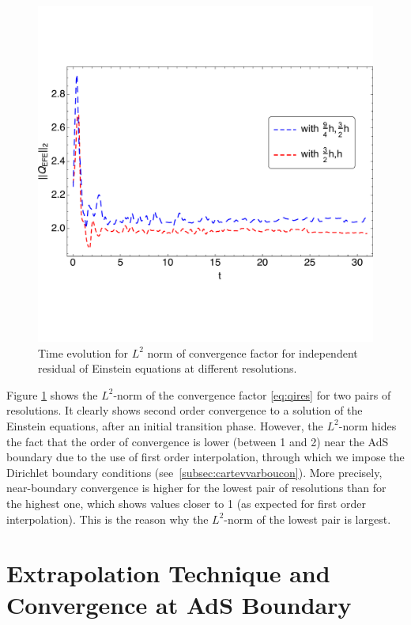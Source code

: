 \documentclass[a4paper,11pt]{article}
\numberwithin{equation}{section}
\begin{document}
\begin{figure}[h]
        \centering
        \includegraphics[width=5.0in,clip=true]{plots/timeseries/L2norm_iresallconvergence/fullplottL2normdim2boundedrescaledconvergenceiresallallres.pdf}
\parbox{5.0in}{\caption{Time evolution for $L^2$ norm of convergence factor for independent residual of Einstein equations at different resolutions.
        }\label{fig:L2norm_iresallconvergence-crop}}
\end{figure}

Figure \ref{fig:L2norm_iresallconvergence-crop} shows the $L^2$-norm of the convergence factor \eqref{eq:qires} for two pairs of resolutions. It clearly shows second order convergence to a solution of the Einstein equations, after an initial transition phase. However, the $L^2$-norm hides the fact that the order of convergence is lower (between 1 and 2) near the AdS boundary due to the use of first order interpolation, through which we impose the Dirichlet boundary conditions (see~\ref{subsec:cartevvarboucon}). More precisely, near-boundary convergence is higher for the lowest pair of resolutions than for the highest one, which shows values closer to 1 (as expected for first order interpolation). This is the reason why the $L^2$-norm of the lowest pair is largest.

\section{Extrapolation Technique and Convergence at AdS Boundary}\label{sec:extrapconvbdy}
\end{document}
